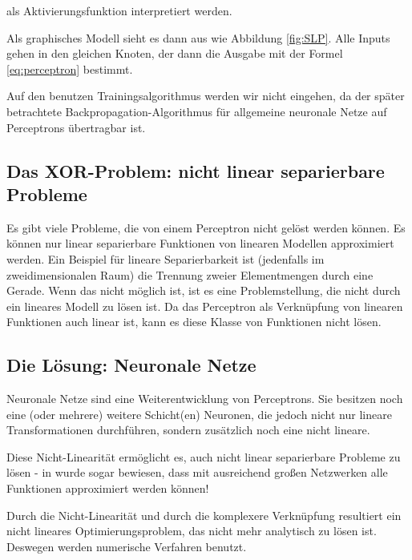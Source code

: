 als Aktivierungsfunktion interpretiert werden.

Als graphisches Modell sieht es dann aus wie Abbildung \ref{fig:SLP}. Alle Inputs gehen in den gleichen Knoten, der dann die Ausgabe mit der Formel \ref{eq:perceptron} bestimmt. 

Auf den benutzen Trainingsalgorithmus werden wir nicht eingehen, da der später betrachtete Backpropagation-Algorithmus für allgemeine neuronale Netze auf Perceptrons übertragbar ist.

\subsection{Das XOR-Problem: nicht linear separierbare Probleme}
Es gibt viele Probleme, die von einem Perceptron nicht gelöst werden können. Es können nur linear separierbare Funktionen von linearen Modellen approximiert werden. Ein Beispiel für lineare Separierbarkeit ist (jedenfalls im zweidimensionalen Raum) die Trennung zweier Elementmengen durch eine Gerade. Wenn das nicht möglich ist, ist es eine Problemstellung, die nicht durch ein lineares Modell zu lösen ist. Da das Perceptron als Verknüpfung von linearen Funktionen auch linear ist, kann es diese Klasse von Funktionen nicht lösen.

\subsection{Die Lösung: Neuronale Netze}
Neuronale Netze sind eine Weiterentwicklung von Perceptrons. Sie besitzen noch eine (oder mehrere) weitere Schicht(en) Neuronen, die jedoch nicht nur lineare Transformationen durchführen, sondern zusätzlich noch eine nicht lineare.

Diese Nicht-Linearität ermöglicht es, auch nicht linear separierbare Probleme zu lösen - in \cite{cybenko1989approximation} wurde sogar bewiesen, dass mit ausreichend großen Netzwerken alle Funktionen approximiert werden können!

Durch die Nicht-Linearität und durch die komplexere Verknüpfung resultiert ein nicht lineares Optimierungsproblem, das nicht mehr analytisch zu lösen ist. Deswegen werden numerische Verfahren benutzt.


